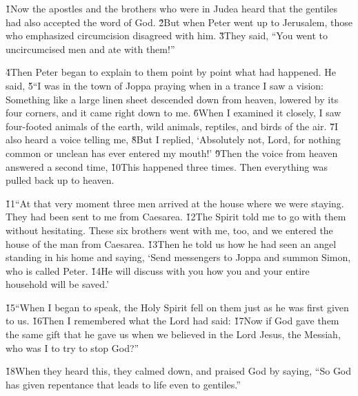 \v{1}Now the apostles and the brothers who were in Judea heard that the gentiles had also accepted the word of God. \v{2}But when Peter went up to Jerusalem, those who emphasized circumcision disagreed with him. \v{3}They said, ``You went to uncircumcised men and ate with them!''

\v{4}Then Peter began to explain to them point by point what had happened. He said, \v{5}``I was in the town of Joppa praying when in a trance I saw a vision: Something like a large linen sheet descended down from heaven, lowered by its four corners, and it came right down to me. \v{6}When I examined it closely, I saw four-footed animals of the earth, wild animals, reptiles, and birds of the air. \v{7}I also heard a voice telling me,  \v{8}But I replied, `Absolutely not, Lord, for nothing common or unclean has ever entered my mouth!' \v{9}Then the voice from heaven answered a second time,  \v{10}This happened three times. Then everything was pulled back up to heaven.

\v{11}``At that very moment three men arrived at the house where we were staying. They had been sent to me from Caesarea. \v{12}The Spirit told me to go with them without hesitating. These six brothers went with me, too, and we entered the house of the man from Caesarea. \v{13}Then he told us how he had seen an angel standing in his home and saying, `Send messengers to Joppa and summon Simon, who is called Peter. \v{14}He will discuss with you how you and your entire household will be saved.'

\v{15}``When I began to speak, the Holy Spirit fell on them just as he was first given to us. \v{16}Then I remembered what the Lord had said:  \v{17}Now if God gave them the same gift that he gave us when we believed in the Lord Jesus, the Messiah, who was I to try to stop God?''

\v{18}When they heard this, they calmed down, and praised God by saying, ``So God has given repentance that leads to life even to gentiles.''

